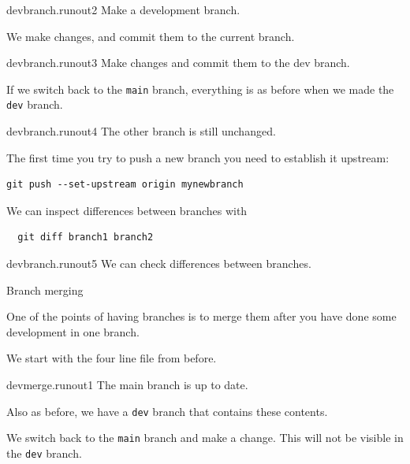\begin{gitstep}{devbranch.runout2}
  Make a development branch.
\end{gitstep}

We make changes, and commit them to the current branch.

\begin{gitstep}{devbranch.runout3}
  Make changes and commit them to the dev branch.
\end{gitstep}

If we switch back to the \lstinline{main} branch,
everything is as before when we made the \lstinline{dev} branch.

\begin{gitstep}{devbranch.runout4}
  The other branch is still unchanged.
\end{gitstep}

The first time you try to push a new branch
you need to establish it upstream:
\begin{lstlisting}
git push --set-upstream origin mynewbranch
\end{lstlisting}

We can inspect differences between branches with 
\begin{lstlisting}
  git diff branch1 branch2
\end{lstlisting}

\begin{gitstep}{devbranch.runout5}
  We can check differences between branches.
\end{gitstep}

\newpage
{} {Branch merging}
\label{sec:git-branch-merge}

One of the points of having branches is to merge
them after you have done some development in one branch.

We start with the four line file from before.

\begin{gitstep}{devmerge.runout1}
  The main branch is up to date.
\end{gitstep}

Also as before, we have a \lstinline{dev} branch that contains
these contents.


We switch back to the \lstinline{main} branch and make a change.
This will not be visible in the \lstinline{dev} branch.


